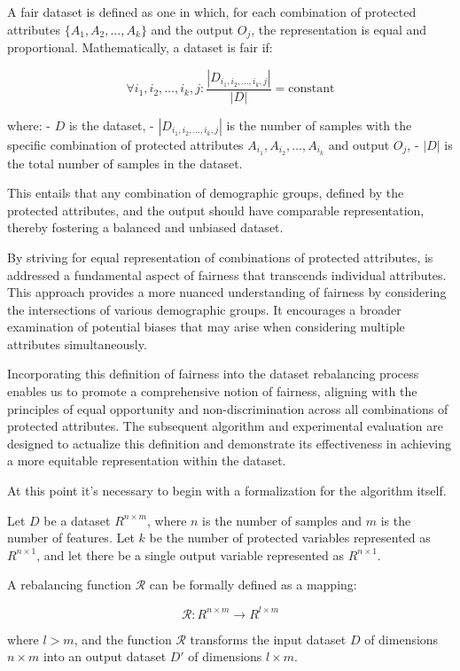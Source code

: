 \documentclass[12pt,a4paper,openright,twoside]{book}
\begin{document}
A fair dataset is defined as one in which, for each combination of protected attributes $\{A_1, A_2, \ldots, A_k\}$ and the output $O_j$, the representation is equal and proportional. Mathematically, a dataset is fair if:

\[
\forall i_1, i_2, \ldots, i_k, j: \frac{|D_{i_1, i_2, \ldots, i_k, j}|}{|D|} = \text{constant}
\]

where:
- $D$ is the dataset,
- $|D_{i_1, i_2, \ldots, i_k, j}|$ is the number of samples with the specific combination of protected attributes $A_{i_1}, A_{i_2}, \ldots, A_{i_k}$ and output $O_j$,
- $|D|$ is the total number of samples in the dataset.

This entails that any combination of demographic groups, defined by the protected attributes, and the output should have comparable representation, thereby fostering a balanced and unbiased dataset.

By striving for equal representation of combinations of protected attributes, is addressed a fundamental aspect of fairness that transcends individual attributes. This approach provides a more nuanced understanding of fairness by considering the intersections of various demographic groups. It encourages a broader examination of potential biases that may arise when considering multiple attributes simultaneously.

Incorporating this definition of fairness into the dataset rebalancing process enables us to promote a comprehensive notion of fairness, aligning with the principles of equal opportunity and non-discrimination across all combinations of protected attributes. The subsequent algorithm and experimental evaluation are designed to actualize this definition and demonstrate its effectiveness in achieving a more equitable representation within the dataset.

At this point it's necessary to begin with a formalization for the algorithm itself.


Let \( D \) be a dataset \( R^{n \times m} \), where \( n \) is the number of samples and \( m \) is the number of features. Let \( k \) be the number of protected variables represented as \( R^{n \times 1} \), and let there be a single output variable represented as \( R^{n \times 1} \).

A rebalancing function \( \mathcal{R} \) can be formally defined as a mapping:

\[
\mathcal{R}: R^{n \times m} \rightarrow R^{l \times m}
\]

where \( l > m \), and the function \( \mathcal{R} \) transforms the input dataset \( D \) of dimensions \( n \times m \) into an output dataset \( D' \) of dimensions \( l \times m \).
\end{document}
